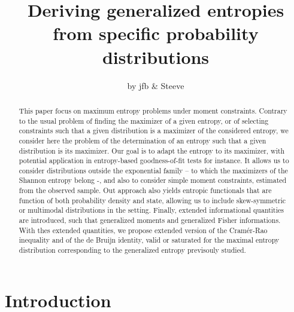 \documentclass[english,sort&compress]{elsarticle}
\theoremstyle{definition}
\theoremstyle{plain}
\theoremstyle{plain}
\begin{document}

\title{Deriving generalized entropies from specific probability distributions}
\author{by jfb \& Steeve \date{} }
\begin{abstract}

  This    paper   focus    on    maximum   entropy    problems   under    moment
  constraints. Contrary to the usual problem of finding the maximizer of a given
  entropy,  or of  selecting constraints  such that  a given  distribution  is a
  maximizer  of the  considered entropy,  we consider  here the  problem  of the
  determination  of   an  entropy  such   that  a  given  distribution   is  its
  maximizer. Our goal  is to adapt the entropy to  its maximizer, with potential
  application in entropy-based goodness-of-fit  tests for instance. It allows us
  to  consider distributions  outside  the  exponential family  –  to which  the
  maximizers of the Shannon entropy belong -, and also to consider simple moment
  constraints,  estimated from  the observed  sample. Out  approach  also yields
  entropic functionals that are function  of both probability density and state,
  allowing  us to  include  skew-symmetric or  multimodal  distributions in  the
  setting. Finally, extended informational  quantities are introduced, such that
  generalized moments  and generalized  Fisher informations. With  thes extended
  quantities, we propose extended version  of the Cram\'er-Rao inequality and of
  the  de  Bruijn   identity,  valid  or  saturated  for   the  maximal  entropy
  distribution corresponding to the generalized entropy previsouly studied.
\end{abstract}

\maketitle



\section{Introduction}
\label{sec:Intro}
\end{document}
